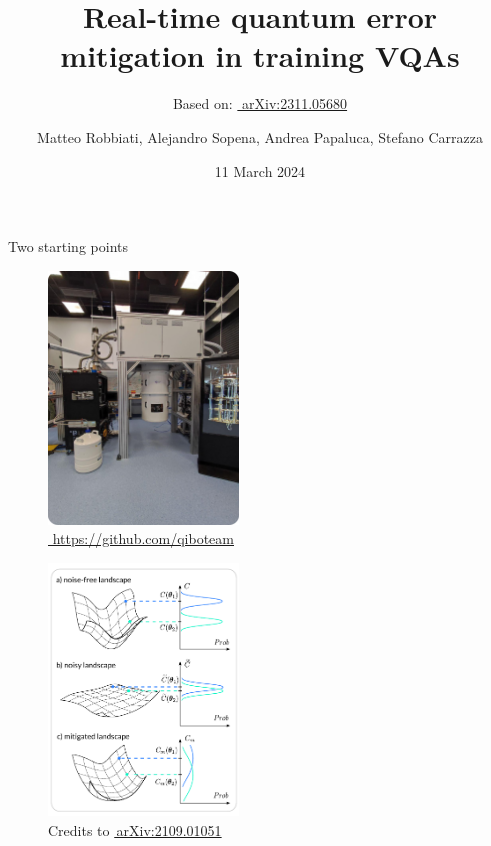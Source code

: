 \documentclass[8pt, xcolor={svgnames}, hyperref={linkcolor=black}]{beamer}
\title{Real-time quantum error mitigation in training VQAs}
\date{11 March 2024}
\author[Matteo Robbiati, Alejandro Sopena, Andrea Papaluca, Stefano Carrazza]{Matteo Robbiati, Alejandro Sopena, Andrea Papaluca, Stefano Carrazza}
\subtitle{Based on: \href{https://arxiv.org/abs/2311.05680}{\faBook\,\,arXiv:2311.05680}}
\begin{document}
\maketitle


\begin{frame}{Two starting points}
\pause
\begin{multicols}{2}
\begin{figure}
\includegraphics[width=0.45\textwidth, height=0.8\textheight]{figures/tii_lab.png}
\caption*{\href{https://github.com/qiboteam}{\faGithub\,\,https://github.com/qiboteam}}
\end{figure}
\pause
\begin{figure}
\includegraphics[width=0.45\textwidth, height=0.8\textheight]{figures/NIBP_cropped.pdf}
\caption*{Credits to \href{https://arxiv.org/abs/2109.01051}{\faBook\,arXiv:2109.01051}}
\end{figure}
\end{multicols}
\end{frame}
\end{document}

